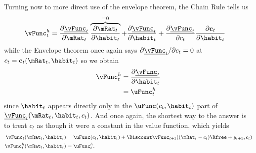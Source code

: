 Turning now to more direct use of the envelope theorem, the Chain Rule
tells us
\begin{equation*}\begin{gathered}\begin{aligned}
        \vFunc_{t}^{h} & =  \frac{\partial \underline{\vFunc}_{t}}{\partial \mRat_{t}}
        \overbrace{\frac{\partial \mRat_{t}}{\partial \habit_{t}}}^{=0}
+ \frac{\partial \underline{\vFunc}_{t}}{\partial \habit_{t}}
+ \frac{\partial \underline{\vFunc}_{t}}{\partial c_{t}}\frac{\partial \mathbf{c}_{t}}{\partial \habit_{t}}
\end{aligned}\end{gathered}\end{equation*}
while the Envelope theorem once again says $\partial \underline{\vFunc}_{t}/\partial
c_{t} = 0$ at $c_{t}=\mathbf{c}_{t}(\mRat_{t},\habit_{t})$ so we obtain
\begin{equation}\begin{gathered}\begin{aligned}
        \vFunc_{t}^{h} & =  \frac{\partial \underline{\vFunc}_{t}}{\partial \habit_{t}}  \\
         & =  \uFunc_{t}^{h}
\end{aligned}\end{gathered}\end{equation}
since $\habit_{t}$ appears directly only in the $\uFunc(c_{t},\habit_{t})$ part of
$\underline{\vFunc}_{t}(\mRat_{t},\habit_{t},c_{t})$.  And once again, the shortest way to
the answer is to treat $c_{t}$ as though it were a constant in
the value function, which yields
\begin{equation}\begin{gathered}\begin{aligned}
        \vFunc_{t}(\mRat_t,\habit_{t}) & =  \uFunc(c_{t},\habit_{t})+\Discount \vFunc_{t+1}((\mRat_{t}-c_{t})\Rfree+y_{t+1},c_{t})  \\
        \vFunc_{t}^{h}(\mRat_{t},\habit_{t}) & =  \uFunc_{t}^{h}.
\end{aligned}\end{gathered}\end{equation}


